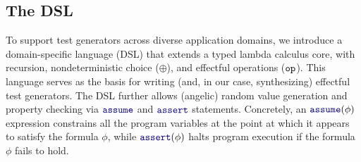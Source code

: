 

\subsection{The \name{} DSL}

To support test generators across diverse application domains, we
introduce a domain-specific language (DSL) that extends a typed lambda
calculus core, with recursion, nondeterministic choice ($\oplus$), and
effectful operations ($\boldsymbol{{\tt op}}$).  This language serves as the basis
for writing (and, in our case, synthesizing) effectful test
generators.
The DSL further allows (angelic) random value generation and property checking
via $\mykw{assume}$ and
$\mykw{assert}$ statements. Concretely, an $\mykw{assume}(\phi)$
expression constrains all the program variables at the point at which
it appears to satisfy the formula $\phi$, while $\mykw{assert}(\phi)$
halts program execution if the formula $\phi$ fails to hold.

